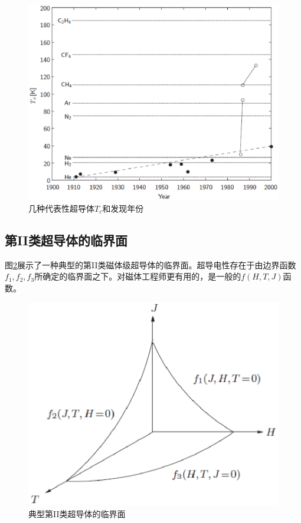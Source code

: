 \begin{figure}
  \centering
 \includegraphics[scale=0.6]{chpt1/figs/fig1.4.eps}
  \caption{
几种代表性超导体$T_c$和发现年份
}\label{tcvsyear}
\end{figure}


\subsection{第II类超导体的临界面}
图\ref{ciriticalsurface}展示了一种典型的第II类磁体级超导体的临界面。超导电性存在于由边界函数$f_1,f_2,f_3$所确定的临界面之下。对磁体工程师更有用的，是一般的$f(H,T,J)$函数。
\begin{figure}
  \centering
 \includegraphics[scale=0.6]{chpt1/figs/fig1.5.eps}
  \caption{
典型第II类超导体的临界面
}\label{ciriticalsurface}
\end{figure}

